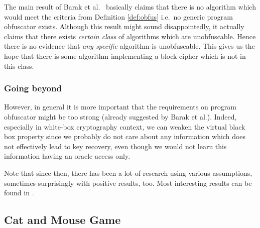 	The main result of Barak et al.\ \cite{barak2001possibility} basically claims that there is no algorithm which would meet the criteria from Definition \ref{def:obfus} i.e.\ no generic program obfuscator exists. Although this result might sound disappointedly, it actually claims that there exists {\em certain class} of algorithms which are unobfuscable. Hence there is no evidence that {\em any specific} algorithm is unobfuscable. This gives us the hope that there is some algorithm implementing a block cipher which is not in this class.

\subsubsection{Going beyond}
	
	However, in general it is more important that the requirements on program obfuscator might be too strong (already suggested by Barak et al.). Indeed, especially in white-box cryptography context, we can weaken the virtual black box property since we probably do not care about any information which does not effectively lead to key recovery, even though we would not learn this information having an oracle access only.
	
	Note that since then, there has been a lot of research using various assumptions, sometimes surprisingly with positive results, too. Most interesting results can be found in \cite{barak2014protecting, brakerski2014virtual}.



\subsection{Cat and Mouse Game}
\label{sec:catmouse}

